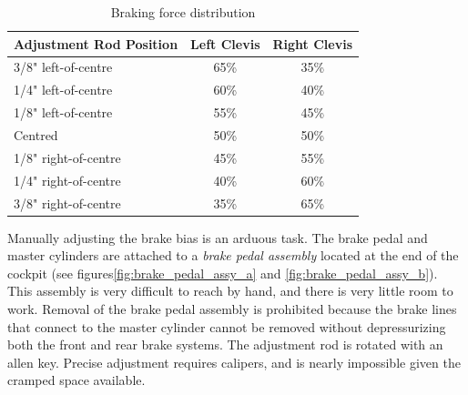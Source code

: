 \begin{table}[H]
	\centering
	\caption{Braking force distribution}
	\label{table:bb_force_distribution}	
	\begin{tabular}{| l | c | c |}
		\hline Adjustment Rod Position & Left Clevis & Right Clevis  \\ \hline
		\hline 3/8" left-of-centre & 65\% & 35\% \\ 
		\hline 1/4" left-of-centre & 60\% & 40\% \\
		\hline 1/8" left-of-centre & 55\% & 45\% \\
		\hline Centred & 50\% & 50\% \\
		\hline 1/8" right-of-centre & 45\% & 55\% \\
		\hline 1/4" right-of-centre & 40\% & 60\% \\
		\hline 3/8" right-of-centre & 35\% & 65\% \\
		\hline
	\end{tabular}
\end{table}

Manually adjusting the brake bias is an arduous task. The brake pedal and master cylinders are attached to a \emph{brake pedal assembly} located at the end of the cockpit (see figures\ref{fig:brake_pedal_assy_a} and \ref{fig:brake_pedal_assy_b}). This assembly is very difficult to reach by hand, and there is very little room to work. Removal of the brake pedal assembly is prohibited because the brake lines that connect to the master cylinder cannot be removed without depressurizing both the front and rear brake systems. The adjustment rod is rotated with an allen key. Precise adjustment requires calipers, and is nearly impossible given the cramped space available.

